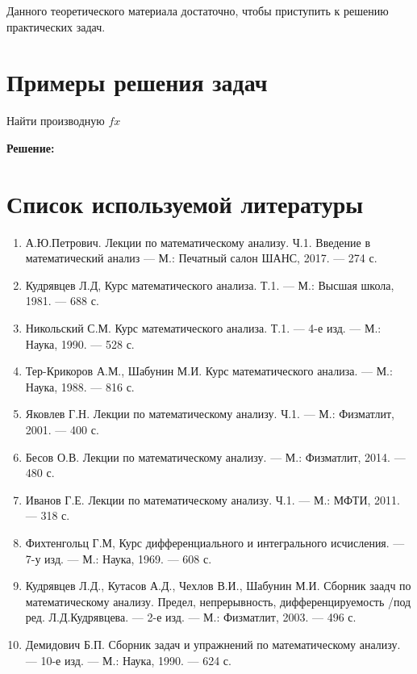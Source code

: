 \documentclass[a4paper,fontsize=16pt]{article}
\begin{document}
Данного теоретического материала достаточно, чтобы приступить к решению практических задач.

\newpage

\section{Примеры решения задач}

\hfill \break
{}

Найти производную $fx$

\textbf{Решение:}


\newpage

\section{Список используемой литературы}

\begin{enumerate}
\item А.Ю.Петрович. Лекции по математическому анализу. Ч.1. Введение в математический анализ --- М.: Печатный салон ШАНС, 2017. --- 274 с.
\item Кудрявцев Л.Д, Курс математического анализа. Т.1. --- М.: Высшая школа, 1981. --- 688 с.
\item Никольский С.М. Курс математического анализа. Т.1. --- 4-е изд. --- М.: Наука, 1990. --- 528 с.
\item Тер-Крикоров А.М., Шабунин М.И. Курс математического анализа. --- М.: Наука, 1988. --- 816 с.
\item Яковлев Г.Н. Лекции по математическому анализу. Ч.1. --- М.: Физматлит, 2001. --- 400 с.
\item Бесов О.В. Лекции по математическому анализу. --- М.: Физматлит, 2014. --- 480 с.
\item Иванов Г.Е. Лекции по математическому анализу. Ч.1. --- М.: МФТИ, 2011. --- 318 с.
\item Фихтенгольц Г.М, Курс дифференциального и интегрального исчисления. --- 7-у изд. --- М.: Наука, 1969. --- 608 с.
\item Кудрявцев Л.Д., Кутасов А.Д., Чехлов В.И., Шабунин М.И. Сборник заадч по математическому анализу. Предел, непрерывность, дифференцируемость /под ред.  Л.Д.Кудрявцева. --- 2-е изд. --- М.: Физматлит, 2003. --- 496 с.
\item Демидович Б.П. Сборник задач и упражнений по математическому анализу. --- 10-е изд. --- М.: Наука, 1990. --- 624 с.
\end{enumerate}
\end{document}
